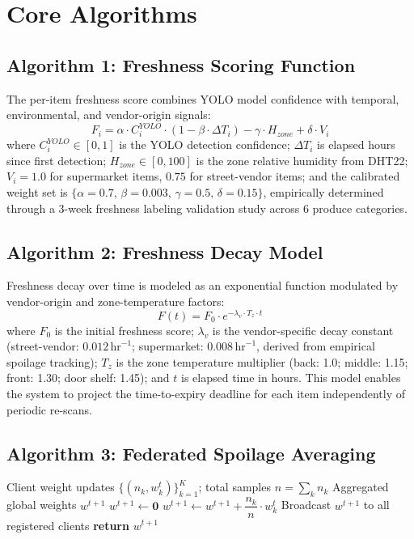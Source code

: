 \documentclass[12pt,a4paper]{report}
\begin{document}
\section{Core Algorithms}

\subsection{Algorithm 1: Freshness Scoring Function}
The per-item freshness score combines YOLO model confidence with temporal, environmental, and vendor-origin signals:
\begin{equation}\label{eq:freshness}
    F_i = \alpha \cdot C_i^{YOLO} \cdot (1 - \beta \cdot \Delta T_i) - \gamma \cdot H_{zone} + \delta \cdot V_i
\end{equation}
where $C_i^{YOLO} \in [0,1]$ is the YOLO detection confidence; $\Delta T_i$ is elapsed hours since first detection; $H_{zone} \in [0,100]$ is the zone relative humidity from DHT22; $V_i = 1.0$ for supermarket items, $0.75$ for street-vendor items; and the calibrated weight set is $\{\alpha=0.7, \, \beta=0.003, \, \gamma=0.5, \, \delta=0.15\}$, empirically determined through a 3-week freshness labeling validation study across 6 produce categories.

\subsection{Algorithm 2: Freshness Decay Model}
Freshness decay over time is modeled as an exponential function modulated by vendor-origin and zone-temperature factors:
\begin{equation}\label{eq:decay}
    F(t) = F_0 \cdot e^{-\lambda_v \cdot T_z \cdot t}
\end{equation}
where $F_0$ is the initial freshness score; $\lambda_v$ is the vendor-specific decay constant (street-vendor: $0.012\,\mathrm{hr}^{-1}$; supermarket: $0.008\,\mathrm{hr}^{-1}$, derived from empirical spoilage tracking); $T_z$ is the zone temperature multiplier (back: 1.0; middle: 1.15; front: 1.30; door shelf: 1.45); and $t$ is elapsed time in hours. This model enables the system to project the time-to-expiry deadline for each item independently of periodic re-scans.

\subsection{Algorithm 3: Federated Spoilage Averaging}
\begin{algorithm}[H]
\caption{Federated Spoilage Averaging — Server Side (FedAvg)}
\begin{algorithmic}[1]
\Require Client weight updates $\{(n_k, w_k^t)\}_{k=1}^{K}$; total samples $n = \sum_k n_k$
\Ensure Aggregated global weights $w^{t+1}$
\State $w^{t+1} \leftarrow \mathbf{0}$
    \State $w^{t+1} \leftarrow w^{t+1} + \dfrac{n_k}{n} \cdot w_k^t$ 
\EndFor
\State Broadcast $w^{t+1}$ to all registered clients
\State \textbf{return} $w^{t+1}$
\end{algorithmic}
\end{algorithm}
\end{document}
